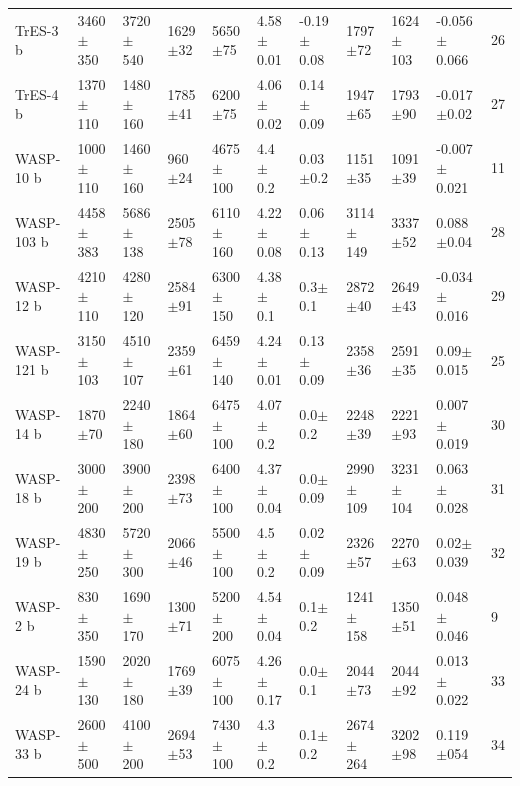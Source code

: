 \begin{subappendices}
{\begin{landscape}
\begin{longtable}{lllllllllll}
TrES-3 b    &    3460$\pm$350 &    3720$\pm$540 &   1629$\pm$32 &    5650$\pm$75 &  4.58$\pm$0.01 &  -0.19$\pm$0.08 &        1797$\pm$72 &       1624$\pm$103 &  -0.056$\pm$0.066 &        26 \\
TrES-4 b    &    1370$\pm$110 &    1480$\pm$160 &   1785$\pm$41 &    6200$\pm$75 &  4.06$\pm$0.02 &   0.14$\pm$0.09 &        1947$\pm$65 &        1793$\pm$90 &   -0.017$\pm$0.02 &        27 \\
WASP-10 b   &    1000$\pm$110 &    1460$\pm$160 &    960$\pm$24 &   4675$\pm$100 &    4.4$\pm$0.2 &    0.03$\pm$0.2 &        1151$\pm$35 &        1091$\pm$39 &  -0.007$\pm$0.021 &         11 \\
WASP-103 b  &    4458$\pm$383 &    5686$\pm$138 &   2505$\pm$78 &   6110$\pm$160 &  4.22$\pm$0.08 &   0.06$\pm$0.13 &       3114$\pm$149 &        3337$\pm$52 &    0.088$\pm$0.04 &      28 \\
WASP-12 b   &    4210$\pm$110 &    4280$\pm$120 &   2584$\pm$91 &   6300$\pm$150 &   4.38$\pm$0.1 &     0.3$\pm$0.1 &        2872$\pm$40 &        2649$\pm$43 &  -0.034$\pm$0.016 &      29 \\
WASP-121 b  &    3150$\pm$103 &    4510$\pm$107 &   2359$\pm$61 &   6459$\pm$140 &  4.24$\pm$0.01 &   0.13$\pm$0.09 &        2358$\pm$36 &        2591$\pm$35 &    0.09$\pm$0.015 &                 25 \\
WASP-14 b   &     1870$\pm$70 &    2240$\pm$180 &   1864$\pm$60 &   6475$\pm$100 &   4.07$\pm$0.2 &     0.0$\pm$0.2 &        2248$\pm$39 &        2221$\pm$93 &   0.007$\pm$0.019 &         30 \\
WASP-18 b   &    3000$\pm$200 &    3900$\pm$200 &   2398$\pm$73 &   6400$\pm$100 &  4.37$\pm$0.04 &    0.0$\pm$0.09 &       2990$\pm$109 &       3231$\pm$104 &   0.063$\pm$0.028 &        31 \\
WASP-19 b   &    4830$\pm$250 &    5720$\pm$300 &   2066$\pm$46 &   5500$\pm$100 &    4.5$\pm$0.2 &   0.02$\pm$0.09 &        2326$\pm$57 &        2270$\pm$63 &    0.02$\pm$0.039 &       32 \\
WASP-2 b    &     830$\pm$350 &    1690$\pm$170 &   1300$\pm$71 &   5200$\pm$200 &  4.54$\pm$0.04 &     0.1$\pm$0.2 &       1241$\pm$158 &        1350$\pm$51 &   0.048$\pm$0.046 &       9 \\
WASP-24 b   &    1590$\pm$130 &    2020$\pm$180 &   1769$\pm$39 &   6075$\pm$100 &  4.26$\pm$0.17 &     0.0$\pm$0.1 &        2044$\pm$73 &        2044$\pm$92 &   0.013$\pm$0.022 &          33 \\
WASP-33 b   &    2600$\pm$500 &    4100$\pm$200 &   2694$\pm$53 &   7430$\pm$100 &    4.3$\pm$0.2 &     0.1$\pm$0.2 &       2674$\pm$264 &        3202$\pm$98 &   0.119$\pm$054 &         34 \\

\end{longtable}
\end{landscape}}
\end{subappendices}
